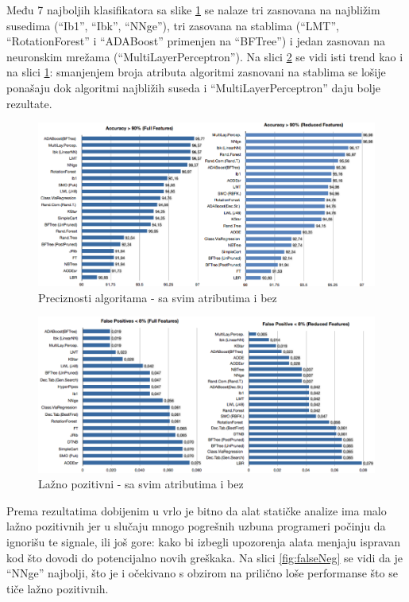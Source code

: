 \documentclass[a4paper]{article}
\theoremstyle{definition}
\begin{document}
{Među 7 najboljih klasifikatora sa slike \ref{fig:acc} se nalaze tri zasnovana na najbližim susedima (``Ib1'', ``Ibk'', ``NNge''), tri zasovana na stablima
(``LMT'', ``RotationForest'' i ``ADABoost'' primenjen na ``BFTree'') i jedan zasnovan na neuronskim mrežama (``MultiLayerPerceptron'').
Na slici  \ref{fig:falsePos} se vidi isti trend kao i na slici  \ref{fig:acc}: smanjenjem broja atributa algoritmi zasnovani na stablima se lošije ponašaju dok algoritmi najbližih suseda i ``MultiLayerPerceptron'' daju bolje rezultate.

\begin{figure}[h!]
\centering
\includegraphics[width=\textwidth]{accuracy.png}
\caption{Preciznosti algoritama - sa svim atributima i bez}
\label{fig:acc}
\end{figure}



\begin{figure}[h!]
\centering
\includegraphics[width=\textwidth]{false_positive.png}
\caption{Lažno pozitivni - sa svim atributima i bez}
\label{fig:falsePos}
\end{figure}

Prema rezultatima dobijenim u  \cite{baca} vrlo je bitno da alat statičke analize ima malo lažno pozitivnih jer
u slučaju mnogo pogrešnih uzbuna programeri počinju da ignorišu te signale, ili još gore: kako bi izbegli upozorenja alata menjaju ispravan kod što dovodi do potencijalno
 novih greškaka. Na slici \ref{fig:falseNeg} se vidi da je ``NNge'' najbolji, što je i očekivano s obzirom na prilično
loše performanse što se tiče lažno pozitivnih.

}
\end{document}
